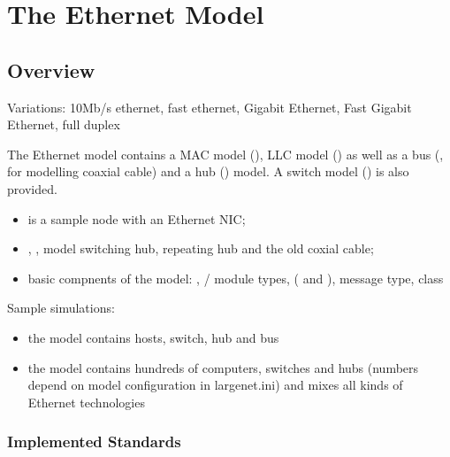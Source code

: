 \chapter{The Ethernet Model}
\label{cha:ethernet}


\section{Overview}

Variations: 10Mb/s ethernet, fast ethernet, Gigabit Ethernet, Fast Gigabit Ethernet, full duplex

The Ethernet model contains a MAC model (), LLC model () as well
as a bus (, for modelling coaxial cable) and a hub () model.
A switch model () is also provided.

\begin{itemize}
  \item {} is a sample node with an Ethernet NIC;
  \item {}, ,  model switching hub, repeating hub and
        the old coxial cable;
  \item basic compnents of the model: , / module types,
         ( and ),  message type,
         class
\end{itemize}

Sample simulations:

\begin{itemize}
  \item the  model contains hosts, switch, hub and bus
  \item the  model contains hundreds of computers, switches and hubs
        (numbers depend on model configuration in largenet.ini) and mixes all
        kinds of Ethernet technologies
\end{itemize}

\subsection{Implemented Standards}

